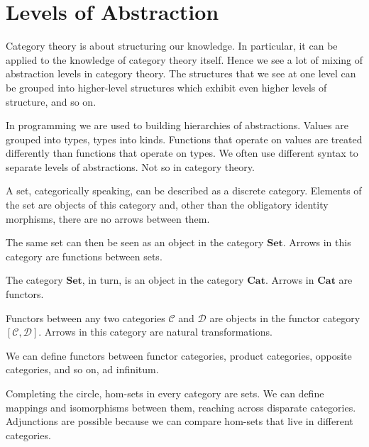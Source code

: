 \documentclass[DaoFP]{subfiles}
\begin{document}
\section{Levels of Abstraction}

Category theory is about structuring our knowledge. In particular, it can be applied to the knowledge of category theory itself. Hence we see a lot of mixing of abstraction levels in category theory. The structures that we see at one level can be grouped into higher-level structures which exhibit even higher levels of structure, and so on. 

In programming we are used to building hierarchies of abstractions. Values are grouped into types, types into kinds. Functions that operate on values are treated differently than functions that operate on types. We often use different syntax to separate levels of abstractions. Not so in category theory.

A set, categorically speaking, can be described as a discrete category. Elements of the set are objects of this category and, other than the obligatory identity morphisms, there are no arrows between them. 

The same set can then be seen as an object in the category $\mathbf{Set}$. Arrows in this category are functions between sets.

The category $\mathbf{Set}$, in turn, is an object in the category $\mathbf{Cat}$. Arrows in $\mathbf{Cat}$ are functors. 

Functors between any two categories $\mathcal{C}$ and $\mathcal{D}$ are objects in the functor category $[\mathcal{C}, \mathcal{D}]$. Arrows in this category are natural transformations.

We can define functors between functor categories, product categories, opposite categories, and so on, ad infinitum. 

Completing the circle, hom-sets in every category are sets. We can define mappings and isomorphisms between them, reaching across disparate categories. Adjunctions are possible because we can compare hom-sets that live in different categories.
\end{document}
